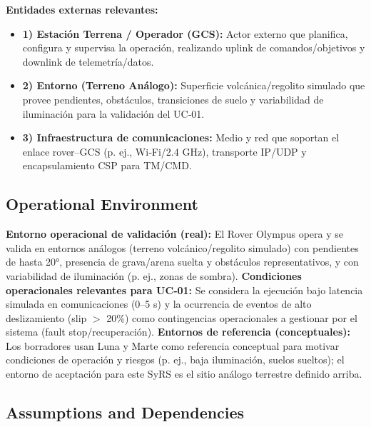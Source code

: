 \textbf{Entidades externas relevantes:}
\begin{itemize}
    \item \textbf{1) Estación Terrena / Operador (GCS):} Actor externo que planifica, configura y supervisa la operación, realizando uplink de comandos/objetivos y downlink de telemetría/datos. \cite{omg_sysml_mbse, nasa_cm, segoldmine_ppi}  
    \item \textbf{2) Entorno (Terreno Análogo):} Superficie volcánica/regolito simulado que provee pendientes, obstáculos, transiciones de suelo y variabilidad de iluminación para la validación del UC‑01. \cite{omg_sysml_mbse, segoldmine_ppi, nasa_cm}  
    \item \textbf{3) Infraestructura de comunicaciones:} Medio y red que soportan el enlace rover–GCS (p. ej., Wi‑Fi/2.4 GHz), transporte IP/UDP y encapsulamiento CSP para TM/CMD. \cite{omg_sysml_mbse, nasa_cm, segoldmine_ppi} 
\end{itemize}

\subsection{Operational Environment}\label{subsec:operational_environment}

\textbf{Entorno operacional de validación (real):} El Rover Olympus opera y se valida en entornos análogos (terreno volcánico/regolito simulado) con pendientes de hasta 20°, presencia de grava/arena suelta y obstáculos representativos, y con variabilidad de iluminación (p. ej., zonas de sombra). \cite{nasa_cm, segoldmine_ppi, omg_sysml_mbse}  
\textbf{Condiciones operacionales relevantes para UC‑01:} Se considera la ejecución bajo latencia simulada en comunicaciones (0–5 s) y la ocurrencia de eventos de alto deslizamiento (slip $>$ 20\%) como contingencias operacionales a gestionar por el sistema (fault stop/recuperación). \cite{nasa_cm, segoldmine_ppi, omg_sysml_mbse}  
\textbf{Entornos de referencia (conceptuales):} Los borradores usan Luna y Marte como referencia conceptual para motivar condiciones de operación y riesgos (p. ej., baja iluminación, suelos sueltos); el entorno de aceptación para este SyRS es el sitio análogo terrestre definido arriba. \cite{omg_sysml_mbse, segoldmine_ppi} 

\subsection{Assumptions and Dependencies}\label{subsec:assumptions}

